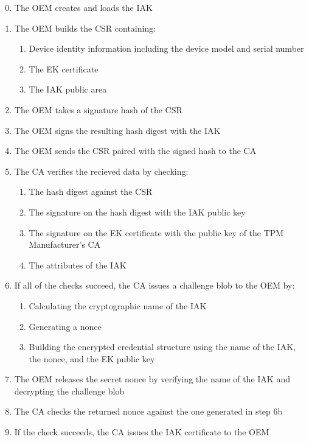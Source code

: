 \begin{enumerate}[itemsep=0pt,parsep=0pt,partopsep=0pt]
  \setcounter{enumi}{-1}
  \item The OEM creates and loads the IAK
  \item The OEM builds the CSR containing:
  \begin{enumerate}[topsep=0pt, itemsep=0pt,parsep=0pt,partopsep=0pt]
    \item Device identity information including the device model and serial
    number
    \item The EK certificate
    \item The IAK public area
  \end{enumerate}
  \item The OEM takes a signature hash of the CSR
  \item The OEM signs the resulting hash digest with the IAK
  \item The OEM sends the CSR paired with the signed hash to the CA
  \item The CA verifies the recieved data by checking:
  \begin{enumerate}[topsep=0pt, itemsep=0pt,parsep=0pt,partopsep=0pt]
    \item The hash digest against the CSR
    \item The signature on the hash digest with the IAK public key
    \item The signature on the EK certificate with the public key of the TPM Manufacturer's CA
    \item The attributes of the IAK
  \end{enumerate}
  \item If all of the checks succeed, the CA issues a challenge blob to the OEM by:
  \begin{enumerate}[topsep=0pt, itemsep=0pt,parsep=0pt,partopsep=0pt]
    \item Calculating the cryptographic name of the IAK
    \item Generating a nonce
    \item Building the encrypted credential structure using the name of the IAK, the nonce, and the EK public key
  \end{enumerate}
  \item The OEM releases the secret nonce by verifying the name of the IAK and decrypting the challenge blob
  \item The CA checks the returned nonce against the one generated in step 6b
  \item If the check succeeds, the CA issues the IAK certificate to the OEM
\end{enumerate}

